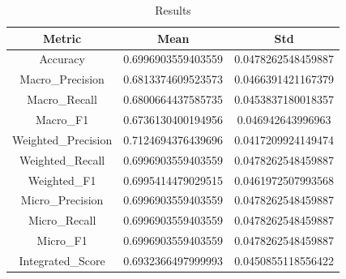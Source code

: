 \begin{table}[htbp]
\centering
\caption{Results}
\label{tab:csv}
\small
\setlength{\tabcolsep}{4pt}
\begin{tabular}{|c|c|c|}
\hline
Metric & Mean & Std \\
\hline
Accuracy & 0.6996903559403559 & 0.0478262548459887 \\
Macro_Precision & 0.6813374609523573 & 0.0466391421167379 \\
Macro_Recall & 0.6800664437585735 & 0.0453837180018357 \\
Macro_F1 & 0.6736130400194956 & 0.046942643996963 \\
Weighted_Precision & 0.7124694376439696 & 0.0417209924149474 \\
Weighted_Recall & 0.6996903559403559 & 0.0478262548459887 \\
Weighted_F1 & 0.6995414479029515 & 0.0461972507993568 \\
Micro_Precision & 0.6996903559403559 & 0.0478262548459887 \\
Micro_Recall & 0.6996903559403559 & 0.0478262548459887 \\
Micro_F1 & 0.6996903559403559 & 0.0478262548459887 \\
Integrated_Score & 0.6932366497999993 & 0.0450855118556422 \\
\hline
\end{tabular}
\end{table}